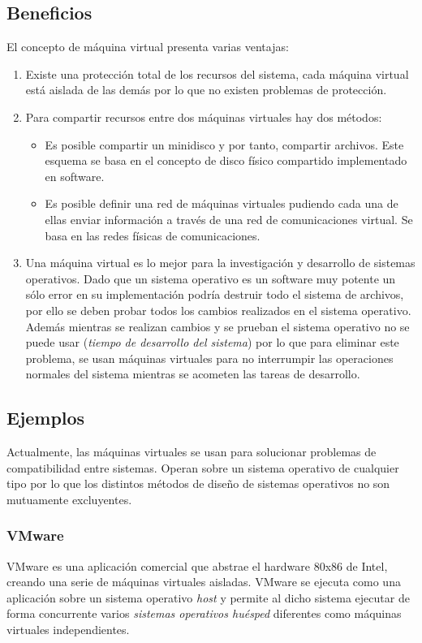 \documentclass[10pt,a4paper,spanish]{report}
\begin{document}
  \subsection{Beneficios}
  \noindent
  El concepto de máquina virtual presenta varias ventajas:
  \begin{enumerate}
    \item Existe una protección total de los recursos del sistema, cada máquina virtual está aislada de las demás por lo que no existen problemas de protección.
    \item Para compartir recursos entre dos máquinas virtuales hay dos métodos:
    \begin{itemize}
      \item Es posible compartir un minidisco y por tanto, compartir archivos. Este esquema se basa en el concepto de disco físico compartido implementado en software.
      \item Es posible definir una red de máquinas virtuales pudiendo cada una de ellas enviar información a través de una red de comunicaciones virtual. Se basa en las redes físicas de comunicaciones.
    \end{itemize}
    \item Una máquina virtual es lo mejor para la investigación y desarrollo de sistemas operativos. Dado que un sistema operativo es un software muy potente un sólo error en su implementación podría destruir todo el sistema de archivos, por ello se deben probar todos los cambios realizados en el sistema operativo. Además mientras se realizan cambios y se prueban el sistema operativo no se puede usar (\textit{{tiempo de desarrollo del sistema}}) por lo que para eliminar este problema, se usan máquinas virtuales para no interrumpir las operaciones normales del sistema mientras se acometen las tareas de desarrollo.
  \end{enumerate}

  \subsection{Ejemplos}
  \noindent
  Actualmente, las máquinas virtuales se usan para solucionar problemas de compatibilidad entre sistemas. Operan sobre un sistema operativo de cualquier tipo por lo que los distintos métodos de diseño de sistemas operativos no son mutuamente excluyentes.

  \subsubsection{VMware}
  \noindent
  VMware es una aplicación comercial que abstrae el hardware 80x86 de Intel, creando una serie de máquinas virtuales aisladas. VMware se ejecuta como una aplicación sobre un sistema operativo \textit{host} y permite al dicho sistema ejecutar de forma concurrente varios \textit{sistemas operativos huésped} diferentes como máquinas virtuales independientes.
\end{document}
